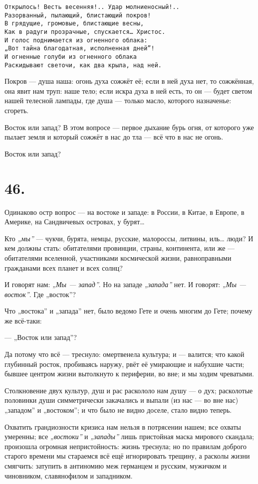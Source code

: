 \documentclass[12pt,a4paper,oneside]{book}
\begin{document}
\begin{Verbatim}
Открылось! Весть весенняя!.. Удар молниеносный!..
Разорванный, пылающий, блистающий покров!
В грядущие, громовые, блистающие весны,
Как в радуги прозрачные, спускается… Христос.
И голос поднимается из огненного облака:
„Вот тайна благодатная, исполненная дней”!
И огненные голуби из огненного облака
Раскидывают светочи, как два крыла, над ней.
\end{Verbatim}

Покров — душа наша: огонь духа сожжёт её; если в ней духа нет, то сожжённая, она явит нам труп: наше тело; если искра духа в ней есть, то он — будет светом нашей телесной лампады, где душа — только масло, которого назначенье: сгореть.

Восток или запад? В этом вопросе — первое дыхание бурь огня, от которого уже пылает земля и который сожжёт в нас до тла — всё что в нас не огонь.

Восток или запад?

\section*{46.}

Одинаково остр вопрос — на востоке и западе: в России, в Китае, в Европе, в Америке, на Сандвичевых островах, у бурят…

Кто \emph{„мы”} — чукчи, бурята, немцы, русские, малороссы, литвины, иль… люди? И кем должны стать: обитателями провинции, страны, континента, или же — обитателями вселенной, участниками космической жизни, равноправными гражданами всех планет и всех солнц?

И говорят нам: \emph{„Мы — запад”}. Но на западе \emph{„запада”} нет. И говорят: \emph{„Мы — восток”}. Где „восток”?

Что „востока” и „запада” нет, было ведомо Гете и очень многим до Гете; почему же всё-таки:

— „Восток или запад”?

Да потому что всё — треснуло: омертвенела культура; и — валится; что какой глубинный росток, пробиваясь наружу, рвёт её умирающие и набухшие части; бывшее центром жизни вытолкнуто к периферии, во вне; и мы ходим чреватыми.

Столкновение двух культур, душ и рас раскололо нам душу — о дух; расколотые половинки души симметрически закачались и выпали (из нас — во вне нас) „западом” и „востоком”; и что было не видно доселе, стало видно теперь.

Охватить грандиозности кризиса нам нельзя в потрясении нашем; все охваты умеренны; все \emph{„востоки”} и \emph{„запады”} лишь пристойная маска мирового скандала; произошла огромная непристойность: жизнь треснула; но по правилам доброго старого времени мы стараемся всё ещё игнорировать трещину, а расколы жизни смягчить: затупить в антиномию меж германцем и русским, мужичком и чиновником, славянофилом и западником.
\end{document}
